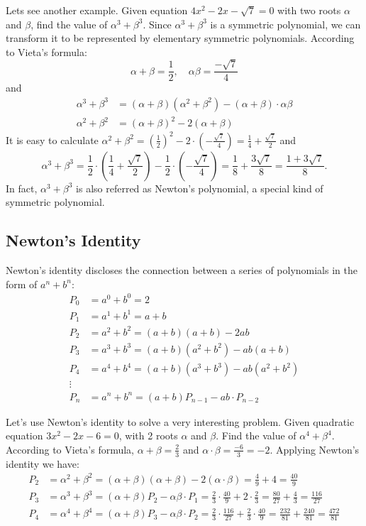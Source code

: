 \documentclass[11pt, oneside]{article}   	%
\begin{document}
  Lets see another example. Given equation $4x^2-2x-\sqrt{7}=0$ with two roots $\alpha$ and $\beta$, find the value of $\alpha^3+\beta^3$. Since $\alpha^3+\beta^3$ is a symmetric polynomial, we can transform it to be represented by elementary symmetric polynomials. According to Vieta's formula:
  \[\alpha+\beta=\frac{1}{2},\quad \alpha\beta=\frac{-\sqrt{7}}{4}\]
  and 
\begin{align*}  
\alpha^3+\beta^3&=(\alpha+\beta)(\alpha^2+\beta^2)-(\alpha+\beta)\cdot \alpha\beta\\
\alpha^2+\beta^2&=(\alpha+\beta)^2-2(\alpha+\beta)
\end{align*}
It is easy to calculate $\alpha^2+\beta^2=(\frac{1}{2})^2-2\cdot(-\frac{\sqrt{7}}{4})=\frac{1}{4}+\frac{\sqrt{7}}{2}$ and 
\[\alpha^3+\beta^3=\frac{1}{2}\cdot(\frac{1}{4}+\frac{\sqrt{7}}{2})-\frac{1}{2}\cdot(-\frac{\sqrt{7}}{4})=\frac{1}{8}+\frac{3\sqrt{7}}{8}=\frac{1+3\sqrt{7}}{8}.\]
In fact, $\alpha^3+\beta^3$ is also referred as Newton's polynomial, a special kind of symmetric polynomial.  

\subsection{Newton's Identity}
Newton's identity discloses the connection between a series of polynomials in the form of $a^n + b^n$: 
\begin{align*}
P_0 &= a^0 + b^0 = 2\\
P_1 &= a^1 + b^1 = a+b\\
P_2 &= a^2 + b^2 = (a+b)(a+b)-2ab\\
P_3 &= a^3 + b^3 = (a+b)(a^2+b^2)-ab(a+b)\\
P_4 &= a^4 + b^4 = (a+b)(a^3+b^3)-ab(a^2+b^2)\\
\vdots\\
P_n &= a^n + b^n = (a+b)P_{n-1}-ab\cdot P_{n-2}
\end{align*}

Let's use Newton's identity to solve a very interesting problem. Given quadratic equation $3x^2-2x-6=0$, with 2 roots $\alpha$ and $\beta$. Find the value of $\alpha^4 + \beta^4$.
According to Vieta's formula, $\alpha+ \beta=\frac{2}{3}$ and $\alpha \cdot \beta = \frac{-6}{3}=-2$. Applying Newton's identity we have:
\begin{align*}
P_2&=\alpha^2 +\beta^2 = (\alpha + \beta)(\alpha + \beta)-2(\alpha \cdot \beta)= \frac{4}{9} + 4 = \frac{40}{9}\\
P_3&=\alpha^3 + \beta^3 = (\alpha + \beta)P_2-\alpha\beta \cdot P_1 = \frac{2}{3} \cdot \frac{40}{9} +2 \cdot \frac{2}{3} = \frac{80}{27}+\frac{4}{3}=\frac{116}{27}\\
P_4&=\alpha^4 +\beta^4 = (\alpha + \beta)P_3-\alpha\beta \cdot P_2 = \frac{2}{3} \cdot \frac{116}{27} + \frac{2}{3} \cdot \frac{40}{9} = \frac{232}{81} + \frac{240}{81}= \frac{472}{81}
\end{align*} 
\end{document}
